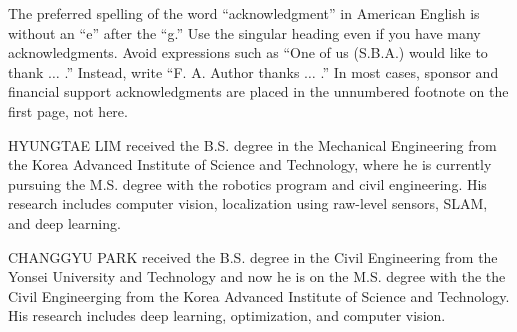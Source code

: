 \documentclass{ieeeaccess}
\begin{document}
The preferred spelling of the word ``acknowledgment'' in American English is 
without an ``e'' after the ``g.'' Use the singular heading even if you have 
many acknowledgments. Avoid expressions such as ``One of us (S.B.A.) would 
like to thank $\ldots$ .'' Instead, write ``F. A. Author thanks $\ldots$ .'' In most 
cases, sponsor and financial support acknowledgments are placed in the 
unnumbered footnote on the first page, not here.





\begin{IEEEbiography}{HYUNGTAE LIM}
	received the B.S. degree in the Mechanical Engineering from the Korea Advanced Institute of Science and Technology, where he is currently pursuing the M.S. degree with the robotics program and civil engineering. His research includes computer vision, localization using raw-level sensors, SLAM, and deep learning.
\end{IEEEbiography}

\begin{IEEEbiography}{CHANGGYU PARK}
	received the B.S. degree in the Civil Engineering from the Yonsei University and Technology and now he is on the M.S. degree with the the Civil Engineerging from the Korea Advanced Institute of Science and Technology. His research includes deep learning, optimization, and computer vision.
\end{IEEEbiography}
\end{document}
